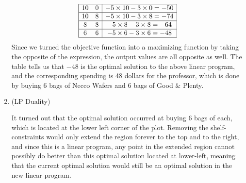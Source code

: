 \documentclass{article}
\begin{document}
\begin{enumerate}
$$\begin{array}{|cc|c|}
        \hline
        10  & 0   & -5 \times 10 - 3 \times 0 = -50 \\
        \hline
        10  & 8   & -5 \times 10 - 3 \times 8 = -74 \\
        \hline
        8   & 8   & -5 \times 8 - 3 \times 8 = -64  \\
        \hline
        6   & 6   & -5 \times 6 - 3 \times 6 = -48  \\
        \hline
      \end{array}
    $$
    Since we turned the objective function into a maximizing function by taking the opposite of the expression, the output values are all opposite as well. The table tells us that $-48$ is the optimal solution to the above linear program, and the corresponding spending is 48 dollars for the professor, which is done by buying 6 bags of Necco Wafers and 6 bags of Good \& Plenty.

    \pagebreak

  \item (LP Duality)

    It turned out that the optimal solution occurred at buying 6 bags of each, which is located at the lower left corner of the plot. Removing the shelf-constraints would only extend the region forever to the top and to the right, and since this is a linear program, any point in the extended region cannot possibly do better than this optimal solution located at lower-left, meaning that the current optimal solution would still be an optimal solution in the new linear program.


\end{enumerate}
\end{document}
